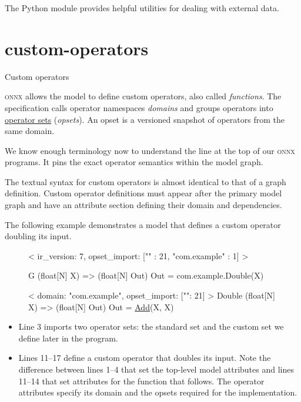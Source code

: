\documentclass{article}
\begin{document}
The \href{https://onnx.ai/onnx/api/external_data_helper.html}{} Python module provides helpful utilities for dealing with external data.

\section{custom-operators}{Custom operators}

\textsc{onnx} allows the model to define custom operators, also called \emph{functions}.
The specification calls operator namespaces \emph{domains}
and groups operators into \href{https://onnx.ai/onnx/repo-docs/Versioning.html#operator-sets}{operator sets} (\emph{opsets}).
An opset is a versioned snapshot of operators from the same domain.

We know enough terminology now to understand the  line at the top of our \textsc{onnx} programs.
It pins the exact operator semantics within the model graph.

The textual syntax for custom operators is almost identical to that of a graph definition.
Custom operator definitions must appear after the primary model graph
and have an attribute section defining their domain and dependencies.

The following example demonstrates a model that defines a custom operator doubling its input.

\begin{figure}
\begin{code}[linenumbers]
<
    ir_version: 7,
    opset_import: ["" : 21, "com.example" : 1]
>

G (float[N] X) => (float[N] Out)
{
    Out = com.example.Double(X)
}

<
    domain: "com.example",
    opset_import: ["": 21]
>
Double (float[N] X) => (float[N] Out) {
    Out = \href{https://onnx.ai/onnx/operators/onnx__Add.html}{Add}(X, X)
}
\end{code}
\end{figure}

\begin{itemize}
\item
Line 3 imports two operator sets: the standard set and the custom set we define later in the program.
\item
Lines 11--17 define a custom operator that doubles its input.
Note the difference between lines 1--4 that set the top-level model attributes
and lines 11--14 that set attributes for the function that follows.
The operator attributes specify its domain and the opsets required for the implementation.
\end{itemize}
\end{document}
